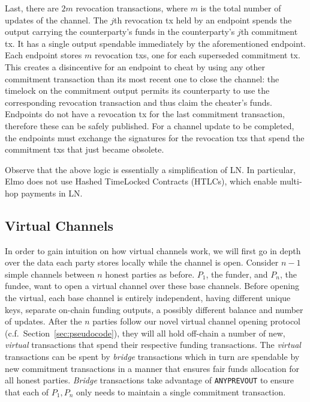   Last, there are $2m$ revocation transactions, where $m$ is the total number of
  updates of the channel. The $j$th revocation tx held by an endpoint spends the
  output carrying the counterparty's funds in the counterparty's $j$th
  commitment tx. It has a single output spendable immediately by the
  aforementioned endpoint. Each endpoint stores $m$ revocation txs, one for each
  superseded commitment tx. This creates a disincentive for an endpoint to cheat
  by using any other commitment transaction than its most recent one to close
  the channel: the timelock on the commitment output permits its counterparty to
  use the corresponding revocation transaction and thus claim the cheater's
  funds.  Endpoints do not have a revocation tx for the last commitment
  transaction, therefore these can be safely published. For a channel update to
  be completed, the endpoints must exchange the signatures for the revocation
  txs that spend the commitment txs that just became obsolete.

  Observe that the above logic is essentially a simplification of LN. In
  particular, Elmo does not use Hashed TimeLocked Contracts (HTLCs), which
  enable multi-hop payments in LN.

\subsection{Virtual Channels}
  In order to gain intuition on how virtual channels work, we will first
  go in depth over the data each party stores locally while the channel is open.
  Consider $n-1$
  simple channels between $n$ honest parties as before. $P_1$, the
  funder, and $P_n$, the fundee, want to open a virtual channel over these base
  channels.
  Before opening the virtual, each base channel is entirely independent, having
  different unique keys, separate on-chain funding outputs, a possibly different
  balance and number of updates. After the $n$ parties follow our novel virtual
  channel opening protocol (c.f.\ Section~\ref{sec:pseudocode}), they will all
  hold off-chain a number of new,
  \emph{virtual} transactions that spend their respective funding transactions. The
  \emph{virtual} transactions can be spent by \emph{bridge} transactions which in turn
  are spendable by new commitment transactions in a manner that ensures fair
  funds allocation for all honest parties. \emph{Bridge} transactions take
  advantage of \texttt{ANYPREVOUT} to ensure that each of $P_1, P_n$ only needs
  to maintain a single commitment transaction.

